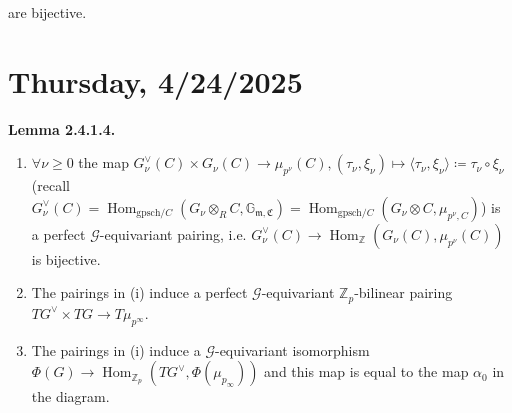 \documentclass{article}
\theoremstyle{definition}
\numberwithin{theorem}{subsection}
\begin{document}
    are bijective.

    \section*{Thursday, 4/24/2025}
    
    \textbf{Lemma 2.4.1.4.}

    \begin{enumerate}[label=\roman*)]
        \item \(\forall \nu \geq 0\) the map \(G_\nu^\vee (C) \times G_\nu(C) \to \mu_{p^{\nu}}(C), (\tau_\nu, \xi_\nu) \mapsto \langle \tau_\nu, \xi_\nu \rangle \coloneqq \tau_\nu \circ \xi_\nu\) (recall \(G_\nu^\vee(C) = \operatorname{Hom}_{\text{gpsch} / C}(G_\nu \otimes_R C, \mathbb{G}_{\mathfrak{m, C}}) = \operatorname{Hom}_{\text{gpsch} / C}(G_\nu \otimes C, \mu_{p^\nu, C})\)) is a perfect \(\mathscr{G}\)-equivariant pairing, i.e. \(G_\nu^\vee (C) \to \operatorname{Hom}_{\mathbb{Z}}(G_\nu(C), \mu_{p^\nu}(C))\) is bijective.
        \item The pairings in (i) induce a perfect \(\mathscr{G}\)-equivariant \(\mathbb{Z}_p\)-bilinear pairing \(TG^\vee \times TG \to T \mu_{p^{\infty}}\).
        \item The pairings in (i) induce a \(\mathscr{G}\)-equivariant isomorphism \(\Phi(G)\to \operatorname{Hom}_{\mathbb{Z}_p}(TG^\vee, \Phi(\mu_{p_\infty}))\) and this map is equal to the map \(\alpha_0\) in the diagram. 
    \end{enumerate} 
\end{document}
